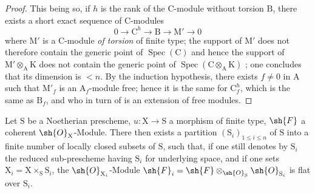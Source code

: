 \begin{proof}
This being so, if $h$ is the rank of the $\mathrm{C}$-module without torsion $\mathrm{B}$, there exists a short exact sequence of $\mathrm{C}$-modules
\[
0\to\mathrm{C}^h\to\mathrm{B}\to\mathrm{M}'\to 0
\]
where $\mathrm{M}'$ is a $\mathrm{C}$-module \emph{of torsion} of finite type; the support of $\mathrm{M}'$ does not therefore contain the generic point of $\operatorname{Spec}(\mathrm{C})$  and hence the support of $\mathrm{M}'\otimes_\mathrm{A}\mathrm{K}$ does not contain the generic point of $\operatorname{Spec}(\mathrm{C}\otimes_\mathrm{A}\mathrm{K})$ ; one concludes  that its dimension is $<n$. By the induction hypothesis, there exists $f\neq 0$ in $\mathrm{A}$ such that $\mathrm{M}'_f$ is an $\mathrm{A}_f$-module free; hence it is the same for $\mathrm{C}^h_f$, which is the same as $\mathrm{B}_f$, and who in turn of  is an extension of free modules.
\end{proof}

\begin{corollary}[6.9.3]
\label{IV.6.9.3}
Let $\mathrm{S}$ be a Noetherian prescheme, $u:\mathrm{X}\to\mathrm{S}$ a morphism of finite type, $\sh{F}$ a coherent $\sh{O}_\mathrm{X}$-Module. There then exists a partition $(\mathrm{S}_i)_{1\leqslant i\leqslant n}$ of $\mathrm{S}$ into a finite number of locally closed subsets of $\mathrm{S}$, such that, if one still denotes by $\mathrm{S}_i$ the reduced sub-prescheme having $\mathrm{S}_i$ for underlying space, and if one sets $\mathrm{X}_i=\mathrm{X}\times_\mathrm{S}\mathrm{S}_i$, the $\sh{O}_{\mathrm{X}_i}$-Module $\sh{F}_i=\sh{F}\otimes_{\sh{O}_\mathrm{S}}\sh{O}_{\mathrm{S}_i}$ is flat over $\mathrm{S}_i$.
\end{corollary}

